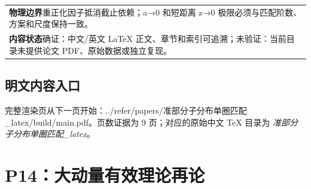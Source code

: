 \documentclass[UTF8,11pt,oneside]{ctexbook}
\begin{document}
\begin{table}[htbp]
\begin{tabular}{@{}p{}@{}}
    \textbf{物理边界}\quad 重正化因子抵消截止依赖；a→0 和短距离 z→0 极限必须与匹配阶数、方案和尺度保持一致。 \\
    \textbf{内容状态}\quad 确证：中文/英文 LaTeX 正文、章节和索引可追溯；未验证：当前目录未提供论文 PDF、原始数据或独立复现。 \\
    \bottomrule
  \end{tabular}
\end{table}
\section*{明文内容入口}
\noindent 完整渲染页从下一页开始：../\allowbreak{}refer/\allowbreak{}papers/\allowbreak{}准部分子分布单圈匹配\_\allowbreak{}latex/\allowbreak{}build/\allowbreak{}main.pdf。页数证据为 9 页；对应的原始中文 TeX 目录为 \emph{准部分子分布单圈匹配\_latex}。
\clearpage

\clearpage

\chapter{P14：大动量有效理论再论}
\end{document}

